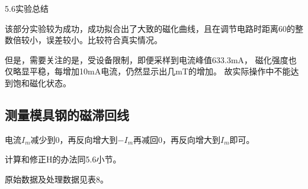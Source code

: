 \documentclass[11pt]{article}
\begin{document}
\begin{center}
    \large{5.6实验总结}
\end{center}



该部分实验较为成功，成功拟合出了大致的磁化曲线，且在调节电路时距离60的整数倍较小，误差较小。比较符合真实情况。

但是，需要关注的是，受设备限制，即便采样到电流峰值633.3mA，
磁化强度也仅略显平稳，每增加10mA电流，仍然显示出几mT的增加。
故实际操作中不能达到饱和磁化状态。





\subsection{测量模具钢的磁滞回线}

电流$I_m$减少到0，再反向增大到$-I_m$再减回0，再反向增大到$I_m$即可。

计算和修正H的办法同5.6小节。

原始数据及处理数据见表8。
\end{document}
